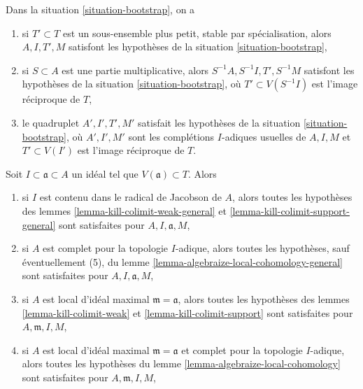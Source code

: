 \begin{lemma}
\label{lemma-bootstrap-inherited}
Dans la situation \ref{situation-bootstrap}, on a
\begin{enumerate}
\item[(E)] si $T' \subset T$ est un sous-ensemble plus petit, stable par spécialisation, alors
$A, I, T', M$ satisfont les hypothèses de la situation \ref{situation-bootstrap},
\item[(F)] si $S \subset A$ est une partie multiplicative, alors
$S^{-1}A, S^{-1}I, T', S^{-1}M$
satisfont les hypothèses de la situation \ref{situation-bootstrap},
où $T' \subset V(S^{-1}I)$ est l'image réciproque de $T$,
\item[(G)] le quadruplet $A', I', T', M'$
satisfait les hypothèses de la situation \ref{situation-bootstrap},
où $A', I', M'$ sont les complétions $I$-adiques usuelles de $A, I, M$
et $T' \subset V(I')$ est l'image réciproque de $T$.
\end{enumerate}
Soit $I \subset \mathfrak a \subset A$ un idéal tel que
$V(\mathfrak a) \subset T$. Alors
\begin{enumerate}
\item[(A)] si $I$ est contenu dans le radical de Jacobson de $A$,
alors toutes les hypothèses des
lemmes \ref{lemma-kill-colimit-weak-general} et
\ref{lemma-kill-colimit-support-general} sont satisfaites
pour $A, I, \mathfrak a, M$,
\item[(B)] si $A$ est complet pour la topologie $I$-adique, alors
toutes les hypothèses, sauf éventuellement (5), du
lemme \ref{lemma-algebraize-local-cohomology-general}
sont satisfaites pour $A, I, \mathfrak a, M$,
\item[(C)] si $A$ est local d'idéal maximal $\mathfrak m = \mathfrak a$,
alors toutes les hypothèses des
lemmes \ref{lemma-kill-colimit-weak} et \ref{lemma-kill-colimit-support}
sont satisfaites pour $A, \mathfrak m, I, M$,
\item[(D)] si $A$ est local d'idéal maximal $\mathfrak m = \mathfrak a$
et complet pour la topologie $I$-adique, alors toutes les hypothèses du
lemme \ref{lemma-algebraize-local-cohomology}
sont satisfaites pour $A, \mathfrak m, I, M$,
\end{enumerate}
\end{lemma}

